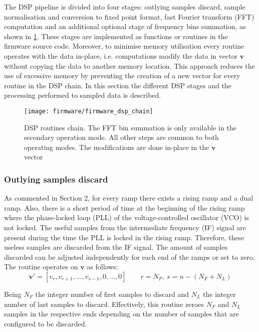 The DSP pipeline is divided into four stages: outlying samples discard, sample normalisation and conversion to fixed point format, fast Fourier transform (FFT) computation and an additional optional stage of frequency bins summation, as shown in \cref{fig:firmware_dsp_chain}. These stages are implemented as functions or routines in the firmware source code. Moreover, to minimise memory utilisation every routine operates with the data in-place, i.e. computations modify the data in vector $\mathbf{v}$ without copying the data to another memory location. This approach reduces the use of excessive memory by preventing the creation of a new vector for every routine in the DSP chain. In this section the different DSP stages and the processing performed to sampled data is described.

\begin{figure}[ht]
	\centering
	\texttt{[image: firmware/firmware\_dsp\_chain]}
	\caption{DSP routines chain. The FFT bin summation is only available in the secondary operation mode. All other steps are common to both operating modes. The modifications are done in-place in the $\mathbf{v}$ vector}
	\label{fig:firmware_dsp_chain}
\end{figure}

\subsubsection{Outlying samples discard}

As commented in Section 2, for every ramp there exists a rising ramp and a dual ramp. Also, there is a short period of time at the beginning of the rising ramp where the phase-locked loop (PLL) of the voltage-controlled oscillator (VCO) is not locked. The useful samples from the intermediate frequency (IF) signal are present during the time the PLL is locked in the rising ramp. Therefore, these useless samples are discarded from the IF signal. The amount of samples discarded can be adjusted independently for each end of the ramps or set to zero. The routine operates on $\mathbf{v}$ as follows:
\begin{equation}
	\mathbf{v'} = [v_{r}, v_{r+1}, ..., v_{s-1}, 0, ..., 0] \qquad r = N_F,\ s= n- (N_F+N_L)
\end{equation}

Being $N_F$ the integer number of first samples to discard and $N_L$ the integer number of last samples to discard. Effectively, this routine zeroes $N_F$ and $N_L$ samples in the respective ends depending on the number of samples that are configured to be discarded. %



